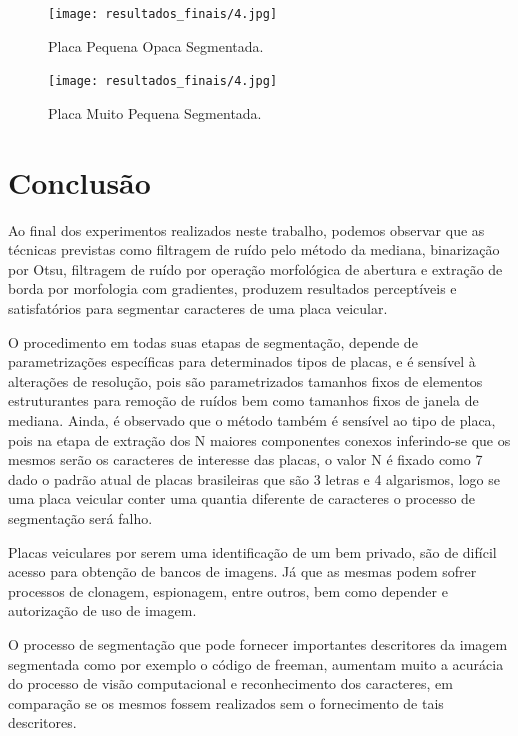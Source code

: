 \documentclass[
	12pt,				%
    oneside,			%
	a4paper,			%
	english,			%
	french,				%
	spanish,			%
	brazil,				%
	]{abntex2}
\begin{document}
\begin{figure}[!ht]
    \centering
    \texttt{[image: resultados\_finais/4.jpg]}
    \caption{Placa Pequena Opaca Segmentada.}
    \label{fig:placa_4_segmentada}
\end{figure}

\begin{figure}[!ht]
    \centering
    \texttt{[image: resultados\_finais/4.jpg]}
    \caption{Placa Muito Pequena Segmentada.}
    \label{fig:placa_7_segmentada}
\end{figure}

\chapter{Conclusão}

Ao final dos experimentos realizados neste trabalho, podemos observar que as técnicas previstas como filtragem de ruído pelo método da mediana, binarização por Otsu, filtragem de ruído por operação morfológica de abertura e extração de borda por morfologia com gradientes, produzem resultados perceptíveis e satisfatórios para segmentar caracteres de uma placa veicular.

O procedimento em todas suas etapas de segmentação, depende de parametrizações específicas para determinados tipos de placas, e é sensível à alterações de resolução, pois são parametrizados tamanhos fixos de elementos estruturantes para remoção de ruídos bem como tamanhos fixos de janela de mediana. Ainda, é observado que o método também é sensível ao tipo de placa, pois na etapa de extração dos N maiores componentes conexos inferindo-se que os mesmos serão os caracteres de interesse das placas, o valor N é fixado como 7 dado o padrão atual de placas brasileiras que são 3 letras e 4 algarismos, logo se uma placa veicular conter uma quantia diferente de caracteres o processo de segmentação será falho.

Placas veiculares por serem uma identificação de um bem privado, são de difícil acesso para obtenção de bancos de imagens. Já que as mesmas podem sofrer processos de clonagem, espionagem, entre outros, bem como depender e autorização de uso de imagem.

O processo de segmentação que pode fornecer importantes descritores da imagem segmentada como por exemplo o código de freeman, aumentam muito a acurácia do processo de visão computacional e reconhecimento dos caracteres, em comparação se os mesmos fossem realizados sem o fornecimento de tais descritores.


\postextual


 
\end{document}
